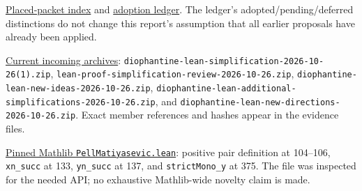 \documentclass[11pt,a4paper]{article}
\newcommand{\code}[1]{\nolinkurl{#1}}
\newcommand{\src}[2]{\href{https://github.com/VladimirReshetnikov/ProveIt/blob/9bd29079d5e1c6cc1c0bcaee6cb57d59b835cba9/#1}{#2}}
\begin{document}
\begin{enumerate}[label={[\arabic*]},leftmargin=9mm]
\item\label{ref:prior}
\src{Computability/DiophantineConsistency/research/lean-proof-simplification/README.md}{Placed-packet index} and
\src{Computability/DiophantineConsistency/research/lean-proof-simplification/ADOPTION.md}{adoption ledger}.
The ledger's adopted/pending/deferred distinctions do not change this report's
assumption that all earlier proposals have already been applied.

\item\label{ref:incoming}
\href{https://github.com/VladimirReshetnikov/ProveIt/tree/9bd29079d5e1c6cc1c0bcaee6cb57d59b835cba9/docs/incoming}{Current incoming archives}:
\code{diophantine-lean-simplification-2026-10-26(1).zip},
\code{lean-proof-simplification-review-2026-10-26.zip},
\code{diophantine-lean-new-ideas-2026-10-26.zip},
\code{diophantine-lean-additional-simplifications-2026-10-26.zip}, and
\code{diophantine-lean-new-directions-2026-10-26.zip}.
Exact member references and hashes appear in the evidence files.

\item\label{ref:mathlib}
\href{https://github.com/leanprover-community/mathlib4/blob/81a5d257c8e410db227a6665ed08f64fea08e997/Mathlib/NumberTheory/PellMatiyasevic.lean}{Pinned Mathlib \code{PellMatiyasevic.lean}}:
positive pair definition at 104--106, \code{xn_succ} at 133,
\code{yn_succ} at 137, and \code{strictMono_y} at 375.
The file was inspected for the needed API; no exhaustive Mathlib-wide
novelty claim is made.
\end{enumerate}
\end{document}
